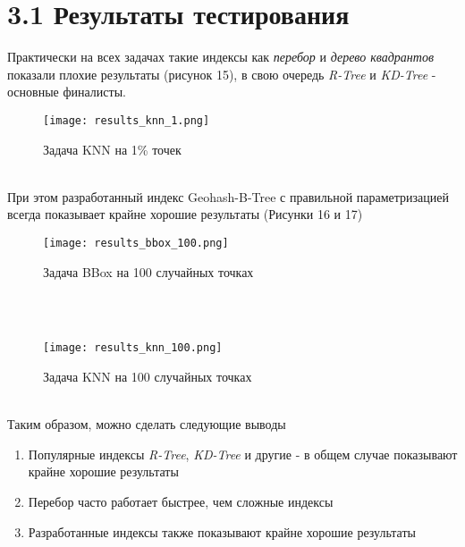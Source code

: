 \section{3.1 Результаты тестирования}

Практически на всех задачах такие индексы как \textit{перебор} и \textit{дерево квадрантов} показали плохие результаты (рисунок 15), в свою очередь \textit{R-Tree} и \textit{KD-Tree} - основные финалисты. 
  \\
\begin{figure}[h]
    \centering
    \texttt{[image: results\_knn\_1.png]}
    \caption{Задача KNN на 1\% точек}
\end{figure}
  \\

При этом разработанный индекс Geohash-B-Tree с правильной параметризацией всегда показывает крайне хорошие результаты (Рисунки 16 и 17)
  \\
\begin{figure}[h]
    \centering
    \texttt{[image: results\_bbox\_100.png]}
    \caption{Задача BBox на 100 случайных точках}
\end{figure}
  \\
  \\
\begin{figure}[h]
    \centering
    \texttt{[image: results\_knn\_100.png]}
    \caption{Задача KNN на 100 случайных точках}
\end{figure}
  \\

Таким образом, можно сделать следующие выводы
\begin{enumerate}
    \item Популярные индексы \textit{R-Tree}, \textit{KD-Tree} и другие - в общем случае показывают крайне хорошие результаты 
    \item Перебор часто работает быстрее, чем сложные индексы
    \item Разработанные индексы также показывают крайне хорошие результаты
\end{enumerate}

